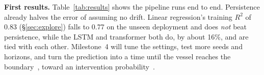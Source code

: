 \documentclass[sigconf]{acmart}
\begin{document}
\textbf{First results.} Table~\ref{tab:results} shows the pipeline runs end to end. Persistence already halves the error of assuming no drift. Linear regression's training $R^2$ of 0.83 (\S\ref{sec:explore}) falls to 0.77 on the unseen deployment and does \emph{not} beat persistence, while the LSTM and transformer both do, by about 16\%, and are tied with each other. Milestone~4 will tune the settings, test more seeds and horizons, and turn the prediction into a time until the vessel reaches the boundary~\cite{dugan2024drifting}, toward an intervention probability~\cite{kristensen2022dynamic}.



\end{document}

